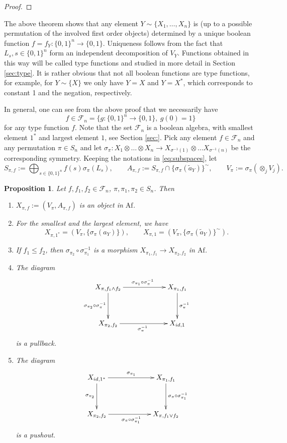 \documentclass[12pt]{article}
\newtheorem{prop}{Proposition}
\theoremstyle{definition}
\theoremstyle{remark}
\def\Fe{\mathcal F}
\def \Af{\mathrm{Af}}
\begin{document}
\begin{proof}
\end{proof}


The above theorem shows that any element $Y\sim\{X_1,\dots,X_n\}$ is (up to a possible permutation
of the involved first order objects)
determined by a unique boolean function $f=f_Y:\{0,1\}^n\to \{0,1\}$. Uniqueness follows from
the fact that $L_s, s\in \{0,1\}^n$ form an independent decomposition of $V_Y$. Functions
obtained in this way will be called type functions and studied in more detail in
Section \ref{sec:type}. 
It is rather obvious that not all boolean functions are type functions, for
example, for $Y\sim \{X\}$ we only have $Y=X$ and $Y=X^*$, which corresponds to constant
1 and the negation, respectively. 

In general, one can see from the above proof that we
necessarily have 
\[
f\in \Fe_n=\{g:\{0,1\}^n\to \{0,1\},\ g(0)=1\}
\]
for any type function $f$. Note that the set $\Fe_n$ is a boolean algebra, with smallest
element $1^*$ and largest element $1$, see Section
\ref{sec:}. Pick any element $f\in \Fe_n$ and any permutation $\pi\in S_n$ and let
$\sigma_\pi: X_1\otimes\dots\otimes  X_n\to X_{\sigma^{-1}(1)}\otimes \dots X_{\sigma^{-1}(n)}$ be the
corresponding symmetry. Keeping the notations in \eqref{eq:subspaces},  let 
\[
S_{\pi,f}:=\bigoplus_{s\in \{0,1\}^n} f(s)\sigma_\pi(L_s),\qquad
A_{\pi,f}:=S_{\pi,f}\cap\{\sigma_\pi(\tilde a_Y)\}^\sim,\qquad
V_\pi:=\sigma_\pi(\otimes_{j}V_{j}).
\]

\begin{prop}\label{prop:xpif} Let $f,f_1,f_2\in \Fe_n$, $\pi,\pi_1,\pi_2
\in S_n$. Then 
\begin{enumerate}
\item[(i)]  $X_{\pi,f}:=(V_\pi, A_{\pi,f})$ is an
object in $\Af$.
\item[(ii)] For the smallest and the largest element, we have  
\[
X_{\pi,1^*}=(V_\pi, \{\sigma_\pi(a_Y)\}),\qquad X_{\pi,1}=(V_\pi,\{\sigma_\pi(\tilde
a_Y)\}^\sim).
\]
\item[(iii)] If $f_1\le f_2$, then 
$\sigma_{\pi_2}\circ\sigma_{\pi_1}^{-1}$ is a morphism $X_{\pi_1,f_1}\to X_{\pi_2,f_2}$ in
$\Af$.
\item[(iv)] The diagram
\[
\xymatrixcolsep{5pc}\xymatrixrowsep{3pc}\xymatrix{
X_{\pi,f_1\wedge
f_2}\ar[r]^{\sigma_{\pi_1}\circ\sigma^{-1}_\pi}
\ar[d]_{\sigma_{\pi_2}\circ\sigma^{-1}_\pi} & X_{\pi_1,f_1}\ar[d]^{\sigma_\pi^{-1}} \\
X_{\pi_2,f_2} \ar[r]_{\sigma_\pi^{-1}}& X_{id,1} 
}
\]
is a pullback.
\item[(v)] The diagram
\[
\xymatrixcolsep{5pc}\xymatrixrowsep{3pc}\xymatrix{
X_{id,1^*}\ar[r]^{\sigma_{\pi_1}}
\ar[d]_{\sigma_{\pi_2}} & X_{\pi_1,f_1}\ar[d]^{\sigma_\pi\circ\sigma_{\pi_1}^{-1}} \\
X_{\pi_2,f_2} \ar[r]_{\sigma_\pi\circ\sigma_{\pi_1}^{-1}}& X_{\pi, f_1\vee f_2} 
}
\]
is a pushout.
\end{enumerate}


\end{prop}
\end{document}
